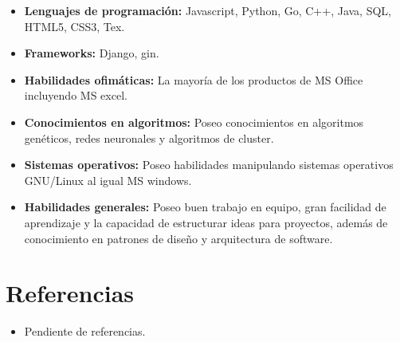 \documentclass[11pt,a4paper,roman]{moderncv}        %
\begin{document}
{	\vspace{6pt}
	
	\begin{itemize}
		
		\item \textbf{Lenguajes de programación:} Javascript, Python, Go, C++, Java, SQL, HTML5, CSS3, Tex.
		
		\vspace{6pt}
		
		\item \textbf{Frameworks:} Django, gin.
		
		\vspace{6pt}
		
		\item \textbf{Habilidades ofimáticas:} La mayoría de los productos de MS Office incluyendo MS excel.
		
		\vspace{6pt}
			
		\item \textbf{Conocimientos en algoritmos:} Poseo conocimientos en algoritmos genéticos, redes neuronales y algoritmos de cluster.
	
		\vspace{6pt}
		
		\item \textbf{Sistemas operativos:} Poseo habilidades manipulando sistemas operativos GNU/Linux al igual MS windows. 
		
		\vspace{6pt}
		
		\item \textbf{Habilidades generales:} Poseo buen trabajo en equipo, gran facilidad de aprendizaje y la capacidad de estructurar ideas para proyectos, además de conocimiento en patrones de diseño y arquitectura de software.
		
	\end{itemize}

	
	\section{Referencias}
	
	\vspace{6pt}
	
	\begin{itemize}
		
		\item{Pendiente de referencias.}
		
	\end{itemize}
	
}
\end{document}
